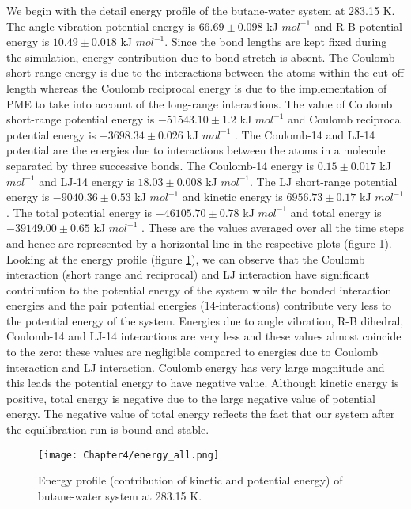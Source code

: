  We begin with the detail energy profile of the butane-water system at 283.15 K. The angle vibration potential energy is $66.69 \pm  0.098$ kJ $mol^{-1}$ and R-B potential energy is $10.49 \pm  0.018 $ kJ $mol^{-1}$. Since the bond lengths are kept fixed during the simulation, energy contribution due  to bond stretch is absent. The Coulomb short-range energy is due to the interactions  between the atoms within the cut-off length whereas the  Coulomb reciprocal energy is due  to the implementation of PME to take into account of the long-range interactions.  The value of  Coulomb short-range potential energy is $-51543.10 \pm  1.2$ kJ $mol^{-1}$ and Coulomb  reciprocal potential energy is $-3698.34 \pm 0.026$ kJ $mol^{-1}$ . The Coulomb-14 and LJ-14 potential are  the energies  due to interactions between the atoms in a molecule separated by three successive bonds. The  Coulomb-14 energy is $0.15 \pm  0.017$ kJ $mol^{-1}$ and LJ-14  energy is $18.03 \pm 0.008$ kJ $mol^{-1}$.  The  LJ short-range potential energy is $-9040.36 \pm 0.53$ kJ $mol^{-1}$ and  kinetic energy is $6956.73 \pm 0.17$ kJ $mol^{-1}$ . The total potential energy is $-46105.70 \pm 0.78$ kJ $mol^{-1}$ and total energy is $- 39149.00 \pm 0.65$ kJ $mol^{-1}$ . These are the values averaged over all the time steps and  hence are represented by a horizontal line in the respective plots (figure \ref{energyprofile-alkane}).  Looking at the energy profile (figure \ref{energyprofile-alkane}), we can observe that the Coulomb interaction (short range and reciprocal) and LJ interaction have significant contribution to the potential  energy of the system while the bonded interaction energies and the pair potential energies (14-interactions) contribute very less to the potential energy of the system. Energies due to angle vibration, R-B dihedral, Coulomb-14 and LJ-14 interactions are very less and these values almost coincide to
  the zero: these values are negligible compared to energies due to Coulomb interaction
  and LJ interaction. Coulomb energy has very large magnitude and this leads the potential energy to have negative value.  Although kinetic energy is positive, total energy  is negative due to the large negative value of potential energy. The negative value of total energy reflects the fact that our system after the equilibration run is bound and  stable. 
 \begin{figure}[h!]
 \centering
 \texttt{[image: Chapter4/energy\_all.png]}
 \caption[Energy profile of butane-water system.]{Energy profile (contribution of kinetic and potential energy) of butane-water system at  283.15 K. } 
 \label{energyprofile-alkane}
 \end{figure}
 
